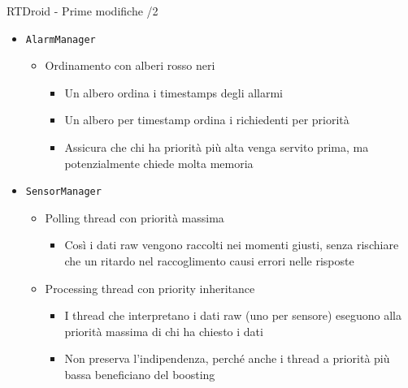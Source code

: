 \begin{frame}{RTDroid - Prime modifiche /2}
	\begin{itemize}
		\item \texttt{AlarmManager}
		\begin{itemize}
			\item Ordinamento con alberi rosso neri
			\begin{itemize}
				\item Un albero ordina i timestamps degli allarmi
				\item Un albero per timestamp ordina i richiedenti per priorità
				\item Assicura che chi ha priorità più alta venga servito prima, ma potenzialmente chiede molta memoria
			\end{itemize}
		\end{itemize}
		\item \texttt{SensorManager}
		\begin{itemize}
			\item Polling thread con priorità massima
			\begin{itemize}
				\item Così i dati raw vengono raccolti nei momenti giusti, senza rischiare che un ritardo nel raccoglimento causi errori nelle risposte
			\end{itemize}
			\item Processing thread con priority inheritance
			\begin{itemize}
				\item I thread che interpretano i dati raw (uno per sensore) eseguono alla priorità massima di chi ha chiesto i dati
				\item Non preserva l'indipendenza, perché anche i thread a priorità più bassa beneficiano del boosting
			\end{itemize}
		\end{itemize}
	\end{itemize}
\end{frame}